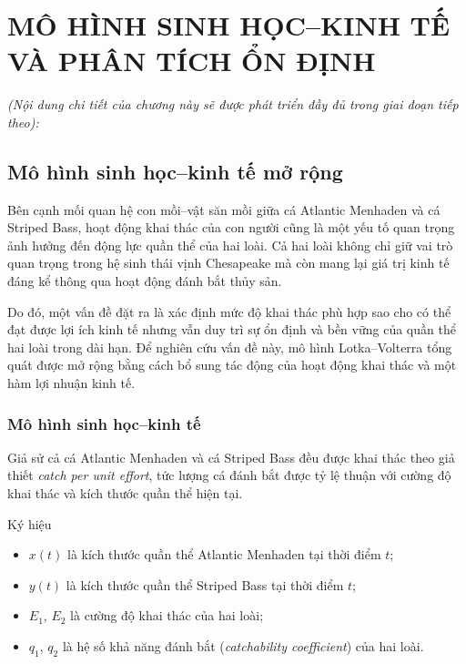 \chapter{MÔ HÌNH SINH HỌC--KINH TẾ VÀ PHÂN TÍCH ỔN ĐỊNH}
\label{ch:bioeconomic}

\textit{(Nội dung chi tiết của chương này sẽ được phát triển đầy đủ trong giai đoạn tiếp theo):}

\section{Mô hình sinh học--kinh tế mở rộng}
\label{sec:ecological_economic}

Bên cạnh mối quan hệ con mồi--vật săn mồi giữa cá Atlantic Menhaden và cá Striped Bass, hoạt động khai thác của con người cũng là một yếu tố quan trọng ảnh hưởng đến động lực quần thể của hai loài. Cả hai loài không chỉ giữ vai trò quan trọng trong hệ sinh thái vịnh Chesapeake mà còn mang lại giá trị kinh tế đáng kể thông qua hoạt động đánh bắt thủy sản.

Do đó, một vấn đề đặt ra là xác định mức độ khai thác phù hợp sao cho có thể đạt được lợi ích kinh tế nhưng vẫn duy trì sự ổn định và bền vững của quần thể hai loài trong dài hạn. Để nghiên cứu vấn đề này, mô hình Lotka--Volterra tổng quát được mở rộng bằng cách bổ sung tác động của hoạt động khai thác và một hàm lợi nhuận kinh tế.

\subsection{Mô hình sinh học--kinh tế}
\label{subsec:bionomic_model}

Giả sử cả cá Atlantic Menhaden và cá Striped Bass đều được khai thác theo giả thiết \textit{catch per unit effort}, tức lượng cá đánh bắt được tỷ lệ thuận với cường độ khai thác và kích thước quần thể hiện tại.

Ký hiệu
\begin{itemize}
    \item $x(t)$ là kích thước quần thể Atlantic Menhaden tại thời điểm $t$;
    \item $y(t)$ là kích thước quần thể Striped Bass tại thời điểm $t$;
    \item $E_1$, $E_2$ là cường độ khai thác của hai loài;
    \item $q_1$, $q_2$ là hệ số khả năng đánh bắt (\textit{catchability coefficient})  của hai loài.
\end{itemize}

